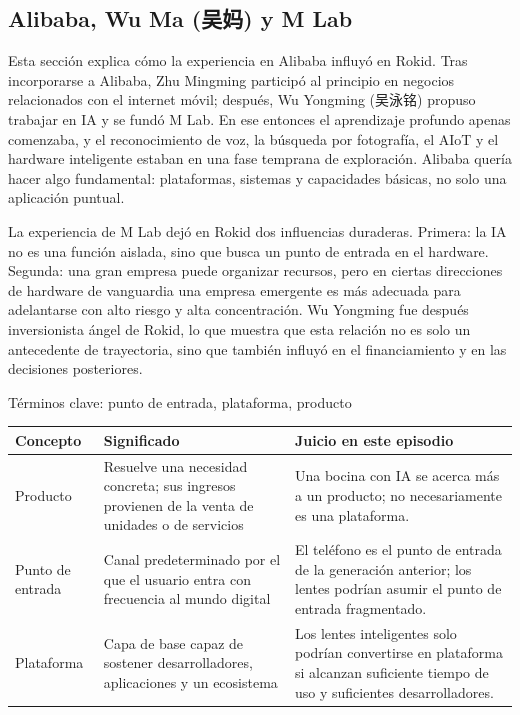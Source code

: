 \documentclass[a4paper]{article}
\begin{document}
\subsection{Alibaba, Wu Ma (吴妈) y M Lab}

Esta sección explica cómo la experiencia en Alibaba influyó en Rokid. Tras incorporarse a Alibaba, Zhu Mingming participó al principio en negocios relacionados con el internet móvil; después, Wu Yongming (吴泳铭) propuso trabajar en IA y se fundó M Lab. En ese entonces el aprendizaje profundo apenas comenzaba, y el reconocimiento de voz, la búsqueda por fotografía, el AIoT y el hardware inteligente estaban en una fase temprana de exploración. Alibaba quería hacer algo fundamental: plataformas, sistemas y capacidades básicas, no solo una aplicación puntual.

La experiencia de M Lab dejó en Rokid dos influencias duraderas. Primera: la IA no es una función aislada, sino que busca un punto de entrada en el hardware. Segunda: una gran empresa puede organizar recursos, pero en ciertas direcciones de hardware de vanguardia una empresa emergente es más adecuada para adelantarse con alto riesgo y alta concentración. Wu Yongming fue después inversionista ángel de Rokid, lo que muestra que esta relación no es solo un antecedente de trayectoria, sino que también influyó en el financiamiento y en las decisiones posteriores.

\begin{knowledgebox}{Términos clave: punto de entrada, plataforma, producto}
\noindent\begin{tabularx}{\textwidth}{p{}p{}X}
\toprule
Concepto & Significado & Juicio en este episodio \\
\midrule
Producto & Resuelve una necesidad concreta; sus ingresos provienen de la venta de unidades o de servicios & Una bocina con IA se acerca más a un producto; no necesariamente es una plataforma. \\
Punto de entrada & Canal predeterminado por el que el usuario entra con frecuencia al mundo digital & El teléfono es el punto de entrada de la generación anterior; los lentes podrían asumir el punto de entrada fragmentado. \\
Plataforma & Capa de base capaz de sostener desarrolladores, aplicaciones y un ecosistema & Los lentes inteligentes solo podrían convertirse en plataforma si alcanzan suficiente tiempo de uso y suficientes desarrolladores. \\
\bottomrule
\end{tabularx}
\end{knowledgebox}
\end{document}
